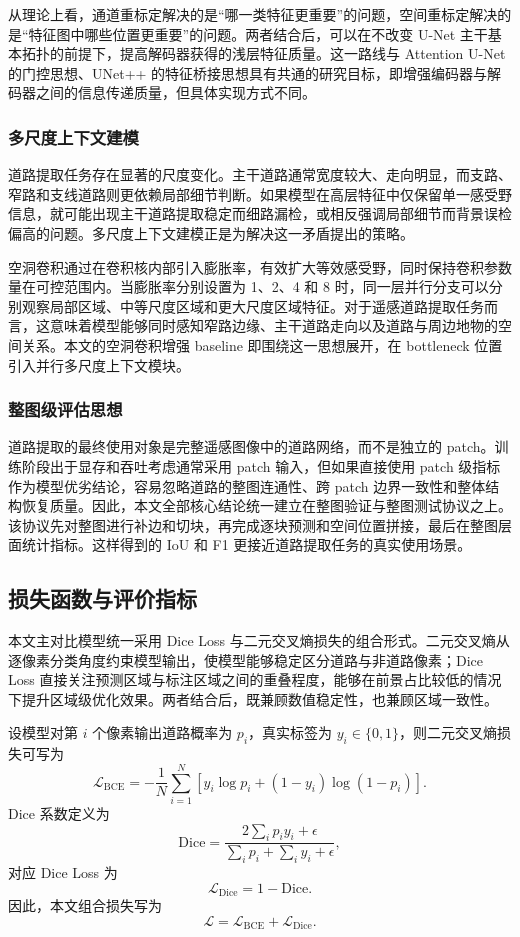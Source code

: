 从理论上看，通道重标定解决的是“哪一类特征更重要”的问题，空间重标定解决的是“特征图中哪些位置更重要”的问题。两者结合后，可以在不改变 U-Net 主干基本拓扑的前提下，提高解码器获得的浅层特征质量。这一路线与 Attention U-Net 的门控思想、UNet++ 的特征桥接思想具有共通的研究目标，即增强编码器与解码器之间的信息传递质量，但具体实现方式不同。

\subsubsection{多尺度上下文建模}
道路提取任务存在显著的尺度变化。主干道路通常宽度较大、走向明显，而支路、窄路和支线道路则更依赖局部细节判断。如果模型在高层特征中仅保留单一感受野信息，就可能出现主干道路提取稳定而细路漏检，或相反强调局部细节而背景误检偏高的问题。多尺度上下文建模正是为解决这一矛盾提出的策略。

空洞卷积通过在卷积核内部引入膨胀率，有效扩大等效感受野，同时保持卷积参数量在可控范围内\cite{dilated2016}。当膨胀率分别设置为 1、2、4 和 8 时，同一层并行分支可以分别观察局部区域、中等尺度区域和更大尺度区域特征。对于遥感道路提取任务而言，这意味着模型能够同时感知窄路边缘、主干道路走向以及道路与周边地物的空间关系。本文的空洞卷积增强 baseline 即围绕这一思想展开，在 bottleneck 位置引入并行多尺度上下文模块。

\subsubsection{整图级评估思想}
道路提取的最终使用对象是完整遥感图像中的道路网络，而不是独立的 patch。训练阶段出于显存和吞吐考虑通常采用 patch 输入，但如果直接使用 patch 级指标作为模型优劣结论，容易忽略道路的整图连通性、跨 patch 边界一致性和整体结构恢复质量。因此，本文全部核心结论统一建立在整图验证与整图测试协议之上。该协议先对整图进行补边和切块，再完成逐块预测和空间位置拼接，最后在整图层面统计指标。这样得到的 IoU 和 F1 更接近道路提取任务的真实使用场景。

\subsection{损失函数与评价指标}
本文主对比模型统一采用 Dice Loss 与二元交叉熵损失的组合形式。二元交叉熵从逐像素分类角度约束模型输出，使模型能够稳定区分道路与非道路像素；Dice Loss 直接关注预测区域与标注区域之间的重叠程度，能够在前景占比较低的情况下提升区域级优化效果。两者结合后，既兼顾数值稳定性，也兼顾区域一致性。

设模型对第 $i$ 个像素输出道路概率为 $p_i$，真实标签为 $y_i \in \{0,1\}$，则二元交叉熵损失可写为
\[
\mathcal{L}_{\mathrm{BCE}}=-\frac{1}{N}\sum_{i=1}^{N}\left[y_i\log p_i + (1-y_i)\log(1-p_i)\right].
\]
Dice 系数定义为
\[
\mathrm{Dice}=\frac{2\sum_i p_i y_i+\epsilon}{\sum_i p_i+\sum_i y_i+\epsilon},
\]
对应 Dice Loss 为
\[
\mathcal{L}_{\mathrm{Dice}}=1-\mathrm{Dice}.
\]
因此，本文组合损失写为
\[
\mathcal{L}=\mathcal{L}_{\mathrm{BCE}}+\mathcal{L}_{\mathrm{Dice}}.
\]

